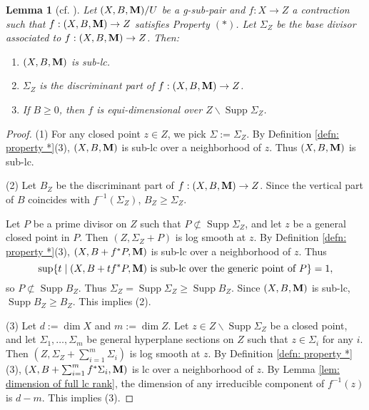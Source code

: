 \documentclass[11pt]{amsart}
\numberwithin{equation}{section}
\newcommand{\Mm}{{\bf{M}}}
\newcommand{\Supp}{\operatorname{Supp}}
\newtheorem{lem}[thm]{Lemma}
\theoremstyle{definition}
\theoremstyle{definition}
\theoremstyle{definition}
\begin{document}
\begin{lem}[cf. {\cite[Lemma 2.14]{ACSS21}}]\label{lem: basic property (*) gpair}
Let $(X,B,\Mm)/U$ be a g-sub-pair and $f: X\rightarrow Z$ a contraction such that $f: (X,B,\Mm)\rightarrow Z$ satisfies Property $(*)$. Let $\Sigma_Z$ be the base divisor associated to $f: (X,B,\Mm)\rightarrow Z$. Then:
\begin{enumerate}
\item $(X,B,\Mm)$ is sub-lc.
\item $\Sigma_Z$ is the discriminant part of $f: (X,B,\Mm)\rightarrow Z$.
\item If $B\geq 0$, then $f$ is equi-dimensional over $Z\backslash\Supp\Sigma_Z$.
\end{enumerate}
\end{lem}
\begin{proof}
 (1) For any closed point $z\in Z$, we pick $\Sigma:=\Sigma_Z$. By Definition \ref{defn: property *}(3), $(X,B,\Mm)$ is sub-lc over a neighborhood of $z$. Thus $(X,B,\Mm)$ is sub-lc.
 
(2) Let $B_Z$ be the discriminant part of $f: (X,B,\Mm)\rightarrow Z$. Since the vertical part of $B$ coincides with $f^{-1}(\Sigma_Z)$, $B_Z\geq\Sigma_Z$.

 Let $P$ be a prime divisor on $Z$ such that $P\not\subset\Supp\Sigma_Z$, and let $z$ be a general closed point in $P$. Then $(Z,\Sigma_Z+P)$ is log smooth at $z$. By Definition \ref{defn: property *}(3), $(X,B+f^*P,\Mm)$ 
is sub-lc over a neighborhood of $z$. Thus
$$\sup\{t\mid (X,B+tf^*P,\Mm)\text{ is sub-lc over the generic point of }P\}=1,$$
so $P\not\subset\Supp B_Z$. Thus $\Sigma_Z=\Supp\Sigma_Z\geq\Supp B_Z$. Since $(X,B,\Mm)$ is sub-lc, $\Supp B_Z\geq B_Z$. This implies (2).

(3) Let $d:=\dim X$ and $m:=\dim Z$. Let $z\in Z\backslash\Supp\Sigma_Z$ be a closed point, and let $\Sigma_1,\dots,\Sigma_m$ be general hyperplane sections on $Z$ such that $z\in \Sigma_i$ for any $i$. Then $(Z,\Sigma_Z+\sum_{i=1}^m\Sigma_i)$ is log smooth at $z$. By Definition \ref{defn: property *}(3), $(X,B+\sum_{i=1}^m f^*\Sigma_i,\Mm)$ is lc over a neighborhood of $z$. By Lemma \ref{lem: dimension of full lc rank}, the dimension of any irreducible component of $f^{-1}(z)$ is $d-m$. This implies (3).
\end{proof}
\end{document}

